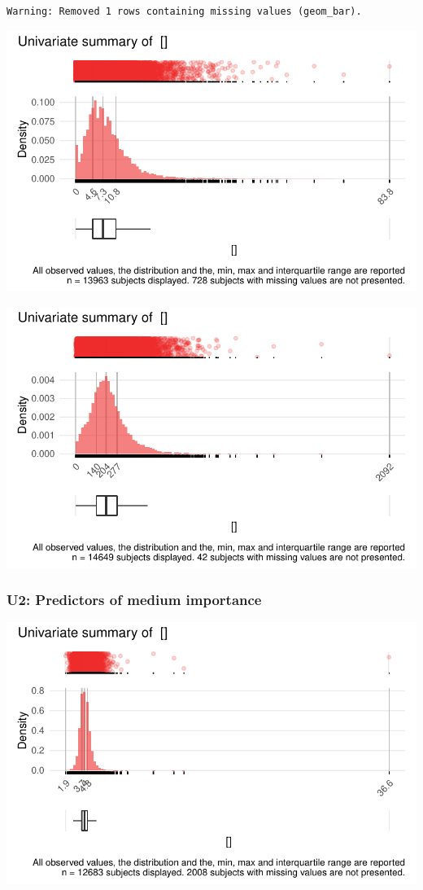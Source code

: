 \documentclass[
  letterpaper,
  DIV=11,
  numbers=noendperiod]{scrreport}
\begin{document}
\begin{verbatim}
Warning: Removed 1 rows containing missing values (geom_bar).
\end{verbatim}

\includegraphics{./Bact_univar_files/figure-pdf/uni02-5.pdf}

\includegraphics{./Bact_univar_files/figure-pdf/uni02-6.pdf}

\hypertarget{u2-predictors-of-medium-importance}{%
\subsubsection{U2: Predictors of medium
importance}\label{u2-predictors-of-medium-importance}}

\includegraphics{./Bact_univar_files/figure-pdf/uni03-1.pdf}
\end{document}
